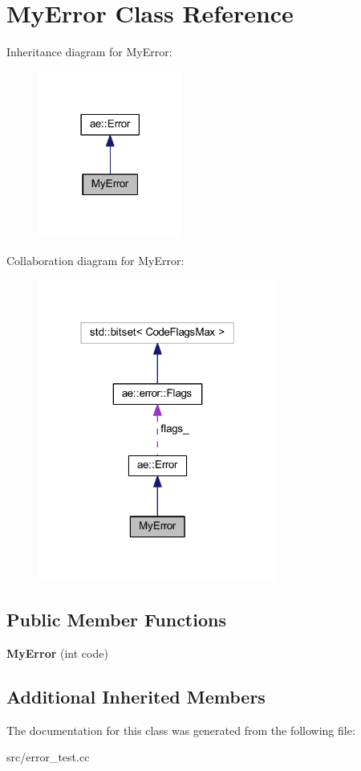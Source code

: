 \hypertarget{class_my_error}{}\section{My\+Error Class Reference}
\label{class_my_error}


Inheritance diagram for My\+Error\+:\nopagebreak
\begin{figure}[H]
\begin{center}
\leavevmode
\includegraphics[width=134pt]{class_my_error__inherit__graph}
\end{center}
\end{figure}


Collaboration diagram for My\+Error\+:\nopagebreak
\begin{figure}[H]
\begin{center}
\leavevmode
\includegraphics[width=223pt]{class_my_error__coll__graph}
\end{center}
\end{figure}
\subsection*{Public Member Functions}
\begin{DoxyCompactItemize}
\item 
\hypertarget{class_my_error_a92df252c67b7a3589f8aba5e7f197eba}{}\label{class_my_error_a92df252c67b7a3589f8aba5e7f197eba} 
{\bfseries My\+Error} (int code)
\end{DoxyCompactItemize}
\subsection*{Additional Inherited Members}


The documentation for this class was generated from the following file\+:\begin{DoxyCompactItemize}
\item 
src/error\+\_\+test.\+cc\end{DoxyCompactItemize}
